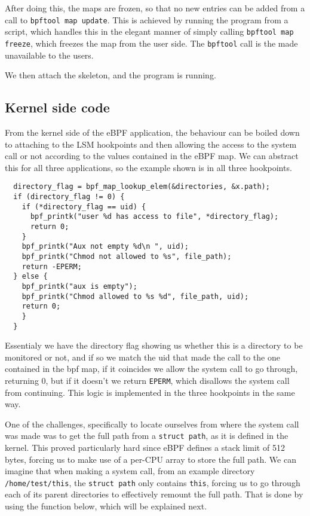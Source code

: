 After doing this, the maps are frozen, so that no new entries can be added from a call to \texttt{bpftool map update}. This is achieved by running the program from a script, which handles this in the elegant manner of simply calling \texttt{bpftool map freeze}, which freezes the map from the user side. The \texttt{bpftool} call is the made unavailable to the users.

We then attach the skeleton, and the program is running.


\subsection{Kernel side code}

From the kernel side of the eBPF application, the behaviour can be boiled down to attaching to the LSM hookpoints and then allowing the access to the system call or not according to the values contained in the eBPF map. We can abstract this for all three applications, so the example shown is in all three hookpoints.

\begin{lstlisting}
  directory_flag = bpf_map_lookup_elem(&directories, &x.path);
  if (directory_flag != 0) {
    if (*directory_flag == uid) {
      bpf_printk("user %d has access to file", *directory_flag);
      return 0;
    }
    bpf_printk("Aux not empty %d\n ", uid);
    bpf_printk("Chmod not allowed to %s", file_path);
    return -EPERM;
  } else {
    bpf_printk("aux is empty");
    bpf_printk("Chmod allowed to %s %d", file_path, uid);
    return 0;
    }
  }
\end{lstlisting}

Essentialy we have the directory flag showing us whether this is a directory to be monitored or not, and if so we match the uid that made the call to the one contained in the bpf map, if it coincides we allow the system call to go through, returning 0, but if it doesn't we return \texttt{\-EPERM}, which disallows the system call from continuing. This logic is implemented in the three hookpoints in the same way.

One of the challenges, specifically to locate ourselves from where the system call was made was to get the full path from a \texttt{struct path}, as it is defined in the kernel. This proved particularly hard since eBPF defines a stack limit of 512 bytes, forcing us to make use of a per-CPU array to store the full path. We can imagine that when making a system call, from an example directory \texttt{/home/test/this}, the \texttt{struct path} only contains \texttt{this}, forcing us to go through each of its parent directories to effectively remount the full path. That is done by using the function below, which will be explained next.
\newpage

